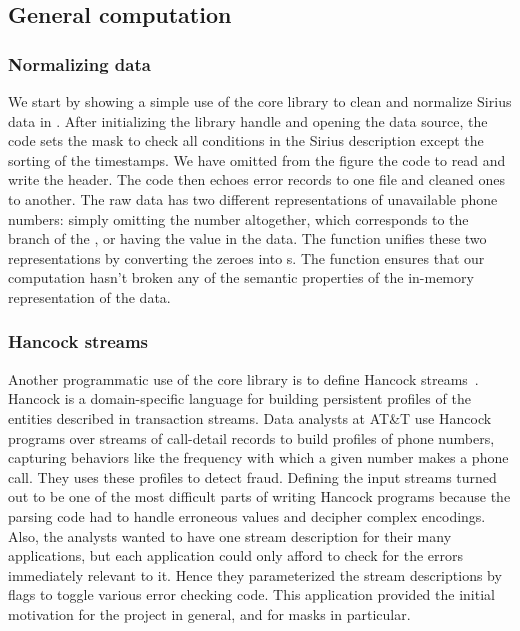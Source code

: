 \documentclass{sig-alternate}
\newcommand{\dibbler}{Sirius}
\begin{document}
\subsection{General computation}
\subsubsection{Normalizing data}
\label{subsec:general}
We start by showing a simple use of 
the core library to clean and normalize \dibbler{} data
in . After initializing
the \pads{} library handle and opening the data source, the code sets
the mask to check all conditions in the \dibbler{} description except the
sorting of the timestamps.  We have omitted from the figure the code to read and write the header. 
The code then echoes error records to one file and cleaned ones to another.
The raw data has two different representations of unavailable phone numbers:
simply omitting the number altogether, which corresponds to the 
branch of the , or having the value  in the data.  
The function  unifies these two representations 
by converting the zeroes into s.  The function 
ensures that our computation hasn't broken any of the semantic properties
of the in-memory representation of the data.
\begin{figure*}
\begin{small}
\begin{center}

\caption{Code fragment for filtering and normalizing \dibbler{} data.}
\label{figure:dibbler-filter}
\end{center}
\end{small}
\end{figure*}

\subsubsection{Hancock streams}
Another programmatic use of the core library is to define  
Hancock streams~\cite{hancock-toplas}.  Hancock is a domain-specific language for
building persistent profiles of the entities described in transaction 
streams.  Data analysts at AT\&T use Hancock 
programs over streams of call-detail records to build 
profiles of phone numbers, capturing behaviors like the frequency with which a given number makes a phone call.  They uses these profiles
to detect fraud. 
Defining the input streams turned out to be one of the most
difficult parts of writing Hancock programs because the parsing
code had to handle erroneous values and decipher complex encodings.  
Also, the analysts wanted to have one stream description for their
many applications, but each application could only afford to check for the errors immediately relevant to it.  Hence they parameterized the 
stream descriptions by flags to toggle various error checking code.
This application provided the initial motivation for the \pads{} project
in general, and for masks in particular.
\end{document}
